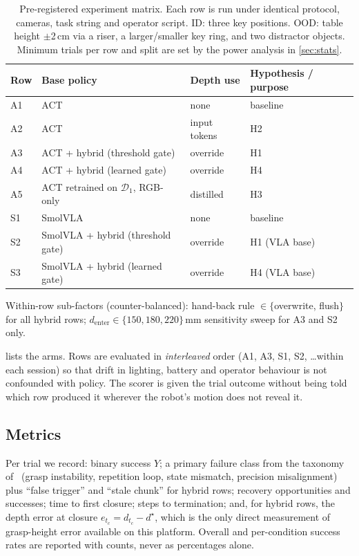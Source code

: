 \documentclass[11pt,a4paper]{article}
\theoremstyle{definition}
\begin{document}
\begin{table}[t]
\centering\small
\caption{Pre-registered experiment matrix. Each row is run under identical protocol, cameras, task string and operator script. ID: three key positions. OOD: table height $\pm$2\,cm via a riser, a larger/smaller key ring, and two distractor objects. Minimum trials per row and split are set by the power analysis in \cref{sec:stats}.}
\label{tab:matrix}
\begin{tabularx}{\textwidth}{@{}l l l X@{}}
\toprule
Row & Base policy & Depth use & Hypothesis / purpose \\
\midrule
A1 & ACT & none & baseline \\
A2 & ACT & input tokens & H2 \\
A3 & ACT + hybrid (threshold gate) & override & H1 \\
A4 & ACT + hybrid (learned gate) & override & H4 \\
A5 & ACT retrained on $\mathcal{D}_1$, RGB-only & distilled & H3 \\
S1 & SmolVLA & none & baseline \\
S2 & SmolVLA + hybrid (threshold gate) & override & H1 (VLA base) \\
S3 & SmolVLA + hybrid (learned gate) & override & H4 (VLA base) \\
\bottomrule
\end{tabularx}
\vspace{2pt}
\begin{flushleft}\footnotesize
Within-row sub-factors (counter-balanced): hand-back rule $\in\{$overwrite, flush$\}$ for all hybrid rows; $d_{\mathrm{enter}}\in\{150,180,220\}$\,mm sensitivity sweep for A3 and S2 only.
\end{flushleft}
\end{table}

 lists the arms. Rows are evaluated in \emph{interleaved} order (A1, A3, S1, S2, \dots within each session) so that drift in lighting, battery and operator behaviour is not confounded with policy. The scorer is given the trial outcome without being told which row produced it wherever the robot's motion does not reveal it.

\subsection{Metrics}

Per trial we record: binary success $Y$; a primary failure class from the taxonomy of~\citep{yu2026so101} (grasp instability, repetition loop, state mismatch, precision misalignment) plus ``false trigger'' and ``stale chunk'' for hybrid rows; recovery opportunities and successes; time to first closure; steps to termination; and, for hybrid rows, the depth error at closure $e_{t_c}=d_{t_c}-d^\star$, which is the only direct measurement of grasp-height error available on this platform. Overall and per-condition success rates are reported with counts, never as percentages alone.
\end{document}
